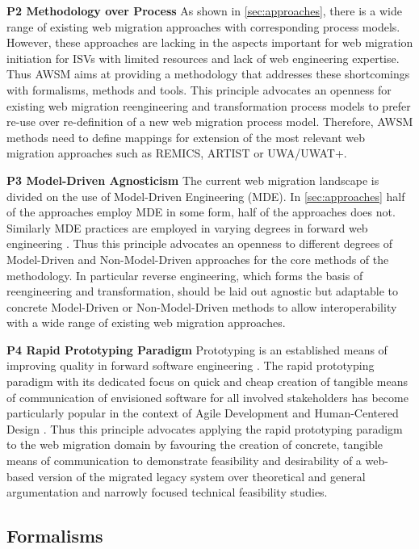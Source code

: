 \textbf{P2 Methodology over Process} As shown in \cref{sec:approaches}, there is a wide range of existing web migration approaches with corresponding process models.
However, these approaches are lacking in the aspects important for web migration initiation for ISVs with limited resources and lack of web engineering expertise.
Thus AWSM aims at providing a methodology that addresses these shortcomings with formalisms, methods and tools.
This principle advocates an openness for existing web migration reengineering and transformation process models to prefer re-use over re-definition of a new web migration process model.
Therefore, AWSM methods need to define mappings for extension of the most relevant web migration approaches such as REMICS, ARTIST or UWA/UWAT+.

\textbf{P3 Model-Driven Agnosticism} The current web migration landscape is divided on the use of Model-Driven Engineering (MDE).
In \cref{sec:approaches} half of the approaches employ MDE in some form, half of the approaches does not.
Similarly MDE practices are employed in varying degrees in forward web engineering \autocite{Moreno2008MDWE}.
Thus this principle advocates an openness to different degrees of Model-Driven and Non-Model-Driven approaches for the core methods of the methodology.
In particular reverse engineering, which forms the basis of reengineering and transformation, should be laid out agnostic but adaptable to concrete Model-Driven or Non-Model-Driven methods to allow interoperability with a wide range of existing web migration approaches.

\textbf{P4 Rapid Prototyping Paradigm} Prototyping is an established means of improving quality in forward software engineering \autocite{Wallmueller2001SoftwareQuality}.
The rapid prototyping paradigm \autocite{Gordon1995RapidPrototyping} with its dedicated focus on quick and cheap creation of tangible means of communication of envisioned software for all involved stakeholders \autocite{Alavi1984} has become particularly popular in the context of Agile Development \autocite{Abrahamsson2002Agile} and Human-Centered Design \autocite{HCD2015}.
Thus this principle advocates applying the rapid prototyping paradigm to the web migration domain by favouring the creation of concrete, tangible means of communication to demonstrate feasibility and desirability of a web-based version of the migrated legacy system over theoretical and general argumentation and narrowly focused technical feasibility studies.

\hypertarget{sec:formalisms}{%
\subsection{Formalisms}\label{sec:formalisms}}

